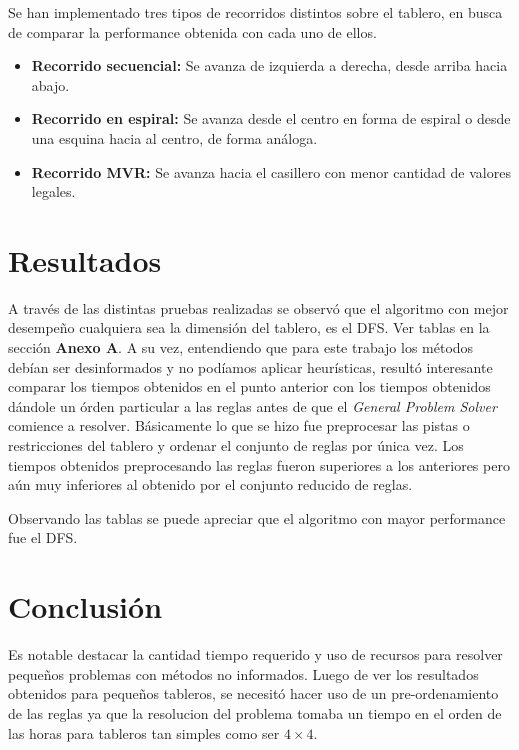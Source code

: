 \documentclass[%
    final,
    reprint,
    notitlepage,
    narroweqnarray,
    inline,
    twoside,
    invited
    ]{ieee}
\begin{document}
\par Se han implementado tres tipos de recorridos distintos sobre el tablero, en busca de comparar la performance obtenida con cada uno de ellos.\\

\begin{itemize}
\item \textbf{Recorrido secuencial: } Se avanza de izquierda a derecha, desde arriba hacia abajo.
\item \textbf{Recorrido en espiral: } Se avanza desde el centro en forma de espiral o desde una esquina hacia al centro, de forma análoga.
\item \textbf{Recorrido MVR: } Se avanza hacia el casillero con menor cantidad de valores legales.
\end{itemize}

\section{Resultados}

\par A través de las distintas pruebas realizadas se observó que el algoritmo con mejor desempeño cualquiera sea la dimensión del tablero, es el DFS. Ver tablas en la sección \textbf{Anexo A}. A su vez, entendiendo que para este trabajo los métodos debían ser desinformados y no podíamos aplicar heurísticas,  resultó interesante comparar los tiempos obtenidos en el punto anterior con los tiempos obtenidos dándole un órden particular a las reglas antes de que el \textit{General Problem Solver} comience a resolver. Básicamente lo que se hizo fue preprocesar las pistas o restricciones del tablero y ordenar el conjunto de reglas por única vez. Los tiempos obtenidos preprocesando las reglas fueron superiores a los anteriores pero aún muy inferiores al obtenido por el conjunto reducido de reglas.

\par Observando las tablas se puede apreciar que el algoritmo con mayor performance fue el DFS.

\section{Conclusión}

\PARstart Es notable destacar la cantidad tiempo requerido y uso de recursos para resolver pequeños problemas con métodos no informados. Luego de ver los resultados obtenidos para pequeños tableros, se necesitó hacer uso de un pre-ordenamiento de las reglas ya que la resolucion del problema tomaba un tiempo en el orden de las horas para tableros tan simples como ser $4\times4$.\\
\end{document}
